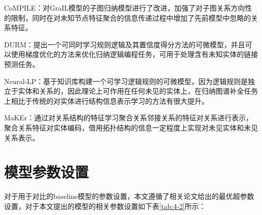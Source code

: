 CoMPILE：对GraIL模型的子图归纳模型进行了改进，加强了对子图关系方向性的限制，同时在对未知节点特征聚合的信息传递过程中增加了先前模型中忽略的关系特征。

DURM：提出一个可同时学习规则逻辑及其置信度得分方法的可微模型，并且可以使用梯度优化的方法来优化归纳逻辑编程任务，可用于处理含有未知实体的链接预测任务。

Neural-LP：基于知识库构建一个可学习逻辑规则的可微模型，因为逻辑规则是独立于实体和关系的，因此理论上可作用在任何未见的实体上，在归纳图谱补全任务上相比于传统的对实体进行结构信息表示学习的方法有很大提升。

MaKEr：通过对关系结构的特征学习聚合关系邻接关系的特征对关系进行表示，聚合关系特征对实体编码，借用拓扑结构的信息一定程度上实现对未见实体和未见关系表示。

\section{模型参数设置}
对于用于对比的baseline模型的参数设置，本文遵循了相关论文给出的最优超参数设置，对于本文提出的模型的相关参数设置如下表\ref{tab:4-2}所示：
